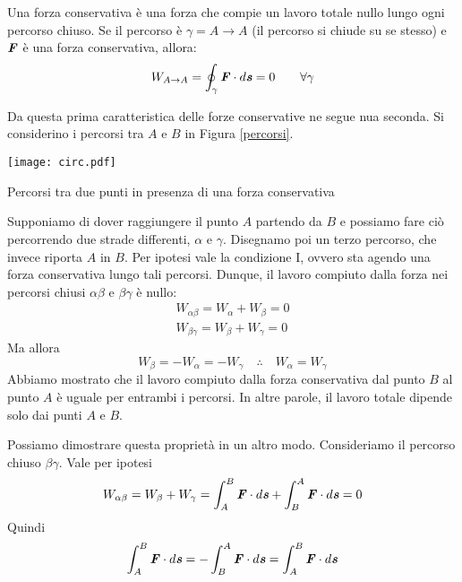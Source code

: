 \vspace{8pt}
\begin{tcolorbox}[colback = red!30, colframe = red!30!black, title = {Forza conservativa (condizione I)}]
    Una forza conservativa è una forza che compie un lavoro totale nullo lungo ogni
    percorso chiuso. Se il percorso è $\gamma = A\to A$ (il percorso si chiude su
    se stesso) e $\textbf{\textit{F}}$ è una forza conservativa, allora:
    \begin{align}
        W_{A \to A} = \oint_\gamma \textbf{\textit{F}} \cdot d\textbf{\textit{s}} = 0 \qquad \forall \gamma
    \end{align}
\end{tcolorbox}
\vspace{5pt}

\noindent Da questa prima caratteristica delle forze conservative ne segue nua
seconda. Si considerino i percorsi tra $A$ e $B$ in Figura \ref{percorsi}.
\begin{marginfigure}
    \centering
    \texttt{[image: circ.pdf]}
    \caption{Percorsi tra due punti in presenza di una forza conservativa}
    \label{percorsi}
\end{marginfigure}
Supponiamo di dover raggiungere il punto $A$ partendo da $B$ e possiamo fare
ciò percorrendo due strade differenti, $\alpha$ e $\gamma$. Disegnamo poi un
terzo percorso, che invece riporta $A$ in $B$.
Per ipotesi vale la condizione I, ovvero sta agendo una forza conservativa
lungo tali percorsi. Dunque, il lavoro compiuto dalla forza nei percorsi chiusi
$\alpha\beta$ e $\beta\gamma$ è nullo:
\begin{align*}
    W_{\alpha\beta} = W_\alpha + W_\beta = 0\\
    W_{\beta\gamma} = W_\beta + W_\gamma = 0
\end{align*}
Ma allora
\[ W_\beta = -W_\alpha = -W_\gamma \quad \therefore \quad W_\alpha = W_\gamma \]
Abbiamo mostrato che il lavoro compiuto dalla forza conservativa dal punto $B$
al punto $A$ è uguale per entrambi i percorsi. In altre parole, il lavoro totale
dipende solo dai punti $A$ e $B$.

Possiamo dimostrare questa proprietà in un altro modo. Consideriamo il percorso
chiuso $\beta\gamma$. Vale per ipotesi
\[ W_{\alpha\beta} = W_\beta + W_\gamma = \int_{A}^{B}\textbf{\textit{F}}\cdot d\textbf{\textit{s}} + \int_{B}^{A}\textbf{\textit{F}}\cdot d\textbf{\textit{s}} = 0 \]
Quindi 
\[ \int_{A}^{B}\textbf{\textit{F}}\cdot d\textbf{\textit{s}} = - \int_{B}^{A}\textbf{\textit{F}}\cdot d\textbf{\textit{s}} = \int_{A}^{B}\textbf{\textit{F}}\cdot d\textbf{\textit{s}} \]

